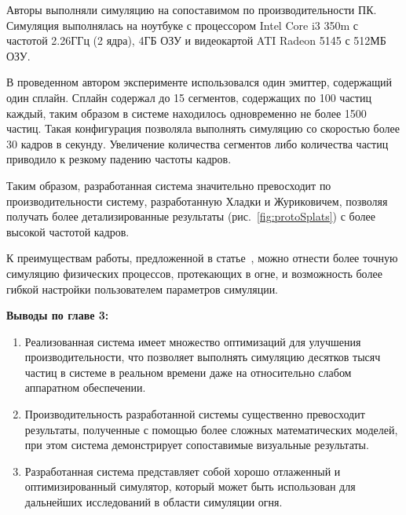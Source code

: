 Авторы выполняли симуляцию на сопоставимом по производительности ПК. Симуляция
выполнялась на ноутбуке с процессором Intel Core i3 350m с частотой 2.26ГГц (2
ядра), 4ГБ ОЗУ и видеокартой ATI Radeon 5145 с 512МБ ОЗУ.

В проведенном автором эксперименте использовался один эмиттер, содержащий один
сплайн. Сплайн содержал до 15 сегментов, содержащих по 100 частиц каждый, таким
образом в системе находилось одновременно не более 1500 частиц. Такая
конфигурация позволяла выполнять симуляцию со скоростью более 30 кадров в
секунду. Увеличение количества сегментов либо количества частиц приводило к
резкому падению частоты кадров.

Таким образом, разработанная система значительно превосходит по
производительности систему, разработанную Хладки и Журиковичем, позволяя
получать более детализированные результаты (рис.~\ref{fig:protoSplats}) с более
высокой частотой кадров.

К преимуществам работы, предложенной в статье~\cite{turbulence}, можно отнести
более точную симуляцию физических процессов, протекающих в огне, и возможность
более гибкой настройки пользователем параметров симуляции.

\textbf{Выводы по главе 3:}
\begin{enumerate}
    \item Реализованная система имеет множество оптимизаций для улучшения
        производительности, что позволяет выполнять симуляцию десятков тысяч
        частиц в системе в реальном времени даже на относительно слабом
        аппаратном обеспечении.
    \item Производительность разработанной системы существенно превосходит результаты,
        полученные с помощью более сложных математических моделей, при этом
        система демонстрирует сопоставимые визуальные результаты.
    \item Разработанная система представляет собой хорошо отлаженный и
        оптимизированный симулятор, который может быть использован для
        дальнейших исследований в области симуляции огня.
\end{enumerate}
